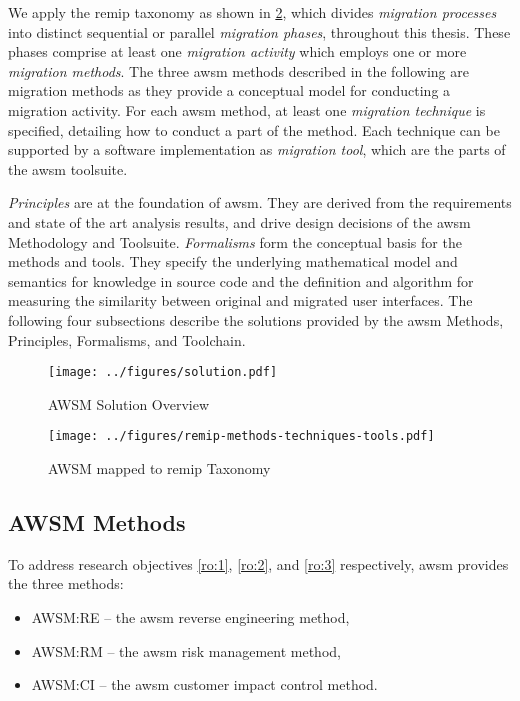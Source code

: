 We apply the \gls{remip} taxonomy  \autocite{Sneed2010SoftwareMigration} as shown in \cref{fig:methods-techniques-tools}, which divides \emph{migration processes} into distinct sequential or parallel \emph{migration phases}, throughout this thesis.
These phases comprise at least one \emph{migration activity} which employs one or more \emph{migration methods}.
The three \gls{awsm} methods described in the following are migration methods as they provide a conceptual model for conducting a migration activity.
For each \gls{awsm} method, at least one \emph{migration technique} is specified, detailing how to conduct a part of the method.
Each technique can be supported by a software implementation as \emph{migration tool}, which are the parts of the \gls{awsm} toolsuite.

\emph{Principles} are at the foundation of \gls{awsm}.
They are derived from the requirements and state of the art analysis results, and drive design decisions of the \gls{awsm} Methodology and Toolsuite.
\emph{Formalisms} form the conceptual basis for the methods and tools.
They specify the underlying mathematical model and semantics for knowledge in  source code and the definition and algorithm for measuring the similarity between original and migrated user interfaces.
The following four subsections describe the solutions provided by the \gls{awsm} Methods, Principles, Formalisms, and Toolchain.

\begin{figure}
\hypertarget{fig:solution}{%
\centering
\texttt{[image: ../figures/solution.pdf]}
\caption{AWSM Solution Overview}\label{fig:solution}
}
\end{figure}

\begin{figure}
\hypertarget{fig:methods-techniques-tools}{%
\centering
\texttt{[image: ../figures/remip-methods-techniques-tools.pdf]}
\caption[AWSM mapped to \gls{remip} Taxonomy]{AWSM mapped to \gls{remip} Taxonomy \autocite[adapted from][]{Sneed2010SoftwareMigration}}\label{fig:methods-techniques-tools}
}
\end{figure}

\hypertarget{sec:solution.methods}{%
\subsection{AWSM Methods}\label{sec:solution.methods}}

To address research objectives \cref{ro:1}, \cref{ro:2}, and \cref{ro:3} respectively, \gls{awsm} provides the three methods:
\begin{itemize}
\item AWSM:RE -- the \gls{awsm} reverse engineering method,
\item AWSM:RM -- the \gls{awsm} risk management method,
\item AWSM:CI -- the \gls{awsm} customer impact control method.
\end{itemize}

